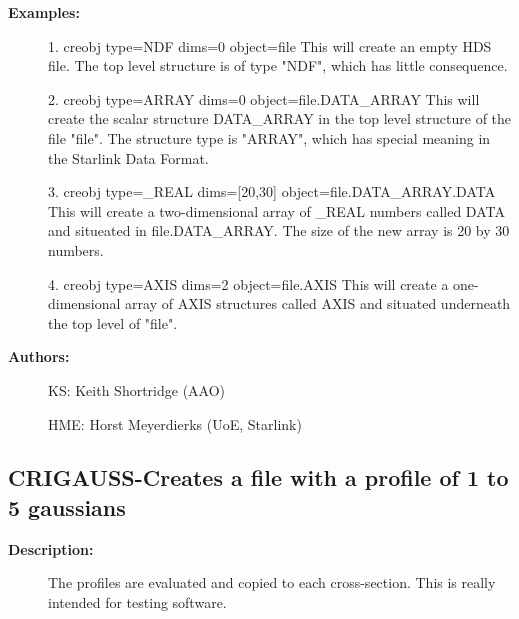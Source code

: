 \begin{description}
\begin{description}
\item [\textbf{Examples:}]
\begin{terminalv}
 1.  creobj type=NDF dims=0 object=file
    This will create an empty HDS file. The top level structure is
    of type "NDF", which has little consequence.

 2.  creobj type=ARRAY dims=0 object=file.DATA_ARRAY
    This will create the scalar structure DATA_ARRAY in the top
    level structure of the file "file". The structure type is
    "ARRAY", which has special meaning in the Starlink Data Format.

 3.  creobj type=_REAL dims=[20,30] object=file.DATA_ARRAY.DATA
    This will create a two-dimensional array of \_REAL numbers
    called DATA and situeated in file.DATA_ARRAY. The size of the
    new array is 20 by 30 numbers.

 4.  creobj type=AXIS dims=2 object=file.AXIS
    This will create a one-dimensional array of AXIS structures
    called AXIS and situated underneath the top level of "file".

\end{terminalv}

\item [\textbf{Authors:}]
 KS: Keith Shortridge (AAO)

 HME: Horst Meyerdierks (UoE, Starlink)

\end{description}
\subsection{CRIGAUSS-\label{CRIGAUSS}Creates a file with a profile of 1 to 5 gaussians}
\begin{description}

\item [\textbf{Description:}]
   The profiles are evaluated and copied to each cross-section.
   This is really intended for testing software.


\end{description}
\end{description}
